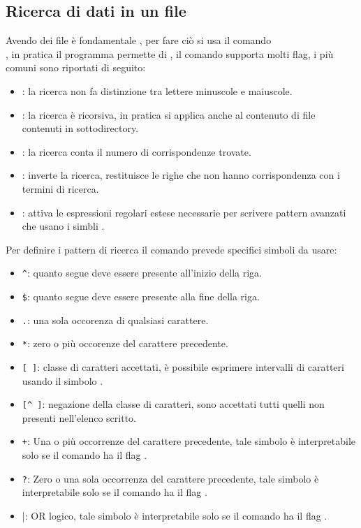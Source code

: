 \subsection{Ricerca di dati in un file}
\label{subsec:Ricerca-di-dati-in-un-file}
Avendo dei file è fondamentale , per fare ciò si usa il comando \\, in pratica il programma permette di , il comando supporta molti flag, i più comuni sono riportati di seguito:
\begin{itemize}
    \item {}: la ricerca non fa distinzione tra lettere minuscole e maiuscole.
    \item {}: la ricerca è ricorsiva, in pratica si applica anche al contenuto di file contenuti in sottodirectory.
    \item {}: la ricerca conta il numero di corrispondenze trovate.
    \item {}: inverte la ricerca, restituisce le righe che non hanno corrispondenza con i termini di ricerca.
    \item {}: attiva le espressioni regolari estese necessarie per scrivere pattern avanzati che usano i simbli .
\end{itemize}  
Per definire i pattern di ricerca il comando prevede specifici simboli da usare:
\begin{itemize}
    \item \verb|^|: quanto segue deve essere presente all'inizio della riga.
    \item \verb|$|: quanto segue deve essere presente alla fine della riga.
    \item \verb|.|: una sola occorenza di qualsiasi carattere.
    \item \verb|*|: zero o più occorenze del carattere precedente.
    \item \verb|[ ]|: classe di caratteri accettati, è possibile esprimere intervalli di caratteri usando il simbolo \ti{-}.
    \item \verb|[^ ]|: negazione della classe di caratteri, sono accettati tutti quelli non presenti nell'elenco scritto.
    \item \verb|+|: Una o più occorrenze del carattere precedente, tale simbolo è interpretabile solo se il comando ha il flag .
    \item \verb|?|: Zero o una sola occorrenza del carattere precedente, tale simbolo è interpretabile solo se il comando ha il flag .
    \item \verb|||: OR logico, tale simbolo è interpretabile solo se il comando ha il flag .
\end{itemize}
